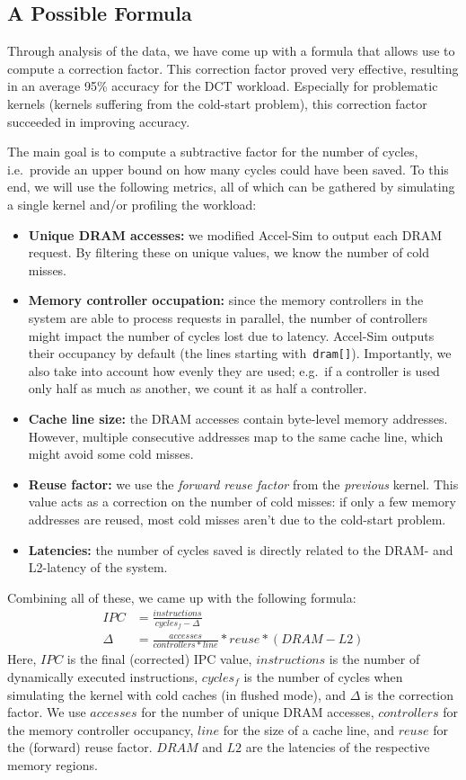 \subsection{A Possible Formula}\label{subsec:formula}
Through analysis of the data, we have come up with a formula that allows use to compute a correction factor.
This correction factor proved very effective, resulting in an average 95\% accuracy for the DCT workload.
Especially for problematic kernels (kernels suffering from the cold-start problem), this correction factor succeeded in improving accuracy.

The main goal is to compute a subtractive factor for the number of cycles, i.e.\ provide an upper bound on how many cycles could have been saved.
To this end, we will use the following metrics, all of which can be gathered by simulating a single kernel and/or profiling the workload:
\begin{itemize}
    \item \textbf{Unique DRAM accesses:} we modified Accel-Sim to output each DRAM request.
    By filtering these on unique values, we know the number of cold misses.
    \item \textbf{Memory controller occupation:} since the memory controllers in the system are able to process requests in parallel, the number of controllers might impact the number of cycles lost due to latency.
    Accel-Sim outputs their occupancy by default (the lines starting with\ \verb|dram[]|).
    Importantly, we also take into account how evenly they are used; e.g.\ if a controller is used only half as much as another, we count it as half a controller.
    \item \textbf{Cache line size:} the DRAM accesses contain byte-level memory addresses.
    However, multiple consecutive addresses map to the same cache line, which might avoid some cold misses.
    \item \textbf{Reuse factor:} we use the \textit{forward reuse factor} from the \emph{previous} kernel.
    This value acts as a correction on the number of cold misses: if only a few memory addresses are reused, most cold misses aren't due to the cold-start problem.
    \item \textbf{Latencies:} the number of cycles saved is directly related to the DRAM- and L2-latency of the system.
\end{itemize}

Combining all of these, we came up with the following formula:
\begin{align}
    IPC &= \frac{instructions}{cycles_f - \Delta} \\
    \Delta &= \frac{accesses}{controllers * line} * reuse * (DRAM - L2)
\end{align}
Here, $IPC$ is the final (corrected) IPC value, $instructions$ is the number of dynamically executed instructions, $cycles_f$ is the number of cycles when simulating the kernel with cold caches (in flushed mode), and $\Delta$ is the correction factor.
We use $accesses$ for the number of unique DRAM accesses, $controllers$ for the memory controller occupancy, $line$ for the size of a cache line, and $reuse$ for the (forward) reuse factor.
$DRAM$ and $L2$ are the latencies of the respective memory regions.

